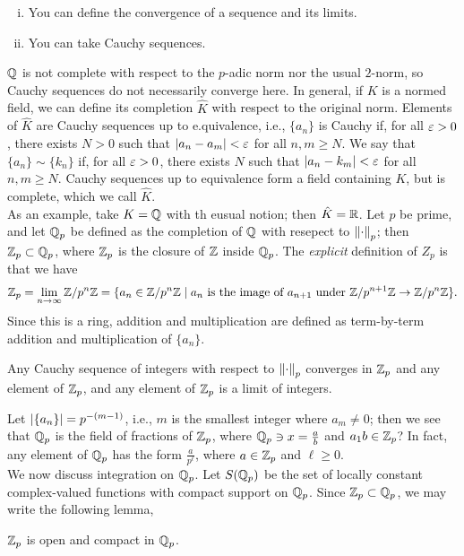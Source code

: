 \begin{enumerate}[(i)]
    \item You can define the convergence of a sequence and its limits.
    \item You can take Cauchy sequences.
\end{enumerate}
\noindent $\mathbb Q$ is not complete with respect to the $p$-adic norm nor the usual $2$-norm, so Cauchy sequences do not necessarily converge here. In general, if $K$ is a normed field, we can define its completion $\hat K$ with respect to the original norm. Elements of $\hat K$ are Cauchy sequences up to e.quivalence, i.e., $\{a_n\}$ is Cauchy if, for all $\varepsilon > 0$, there exists $N > 0$ such that $\left\lvert a_n - a_m \right\rvert < \varepsilon$ for all $n, m \geq N$. We say that $\{a_n\} \sim \{k_n\}$ if, for all $\varepsilon > 0$, there exists $N$ such that $\left\lvert a_n - k_m \right\rvert < \varepsilon$ for all $n, m \geq N$. Cauchy sequences up to equivalence form a field containing $K$, but is complete, which we call $\hat K$.
\\[8pt]
As an example, take $K = \mathbb Q$ with th eusual notion; then $\hat K = \mathbb R$. Let $p$ be prime, and let $\mathbb Q_p$ be defined as the completion of $\mathbb Q$ with resepect to $\left\lVert \cdot \right\rVert_p$; then $\mathbb Z_p \subset \mathbb Q_p$, where $\mathbb Z_p$ is the closure of $\mathbb Z$ inside $\mathbb Q_p$. The \textit{explicit} definition of $Z_p$ is that we have
\[ \mathbb Z_p = \lim_{n \to \infty} \mathbb Z/p^n \mathbb Z = \{a_n \in \mathbb Z/p^n \mathbb Z \mid a_n \text{ is the image of } a_{n+1} \text{ under } \mathbb Z/p^{n+1}\mathbb Z \to \mathbb Z/p^n\mathbb Z\}. \]
Since this is a ring, addition and multiplication are defined as term-by-term addition and multiplication of $\{a_n\}$.
\begin{lemma}
    Any Cauchy sequence of integers with respect to $\left\lVert \cdot \right\rVert_p$ converges in $\mathbb Z_p$ and any element of $\mathbb Z_p$, and any element of $\mathbb Z_p$ is a limit of integers.
\end{lemma}
\noindent Let $\left\lvert \{a_n\} \right\rvert = p^{-(m-1)}$, i.e., $m$ is the smallest integer where $a_m \neq 0$; then we see that $\mathbb Q_p$ is the field of fractions of $\mathbb Z_p$, where $\mathbb Q_p \ni x = \frac{a}{b}$ and $a_1 b \in \mathbb Z_p$? In fact, any element of $\mathbb Q_p$ has the form $\frac{a}{p^\ell}$, where $a \in \mathbb Z_p$ and $\ell \geq 0$.
\\[8pt]
We now discuss integration on $\mathbb Q_p$. Let $S(\mathbb Q_p)$ be the set of locally constant complex-valued functions with compact support on $\mathbb Q_p$. Since $\mathbb Z_p \subset \mathbb Q_p$, we may write the following lemma,
\begin{lemma}
    $\mathbb Z_p$ is open and compact in $\mathbb Q_p$.
\end{lemma}
